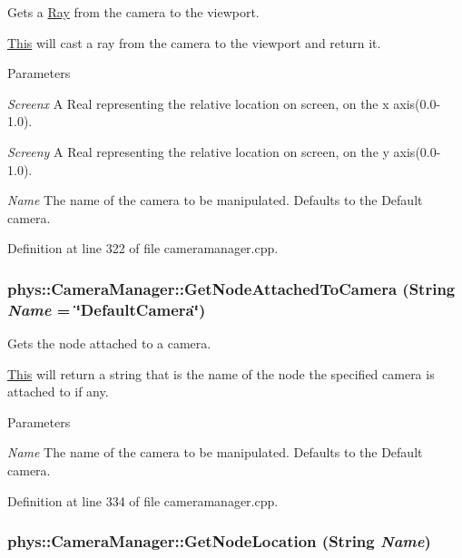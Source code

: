 Gets a \hyperlink{classphys_1_1Ray}{Ray} from the camera to the viewport. 

\hyperlink{structThis}{This} will cast a ray from the camera to the viewport and return it. 
\begin{DoxyParams}{Parameters}
\item[{\em Screenx}]A Real representing the relative location on screen, on the x axis(0.0-\/1.0). \item[{\em Screeny}]A Real representing the relative location on screen, on the y axis(0.0-\/1.0). \item[{\em Name}]The name of the camera to be manipulated. Defaults to the Default camera. \end{DoxyParams}


Definition at line 322 of file cameramanager.cpp.

\hypertarget{classphys_1_1CameraManager_a52a62fcfbeed45a2f527f626731ddcc1}{
\subsubsection[{GetNodeAttachedToCamera}]{ phys::CameraManager::GetNodeAttachedToCamera ({\bf String} {\em Name} = {\ttfamily \char`\"{}DefaultCamera\char`\"{}})}}
\label{d9/d91/classphys_1_1CameraManager_a52a62fcfbeed45a2f527f626731ddcc1}


Gets the node attached to a camera. 

\hyperlink{structThis}{This} will return a string that is the name of the node the specified camera is attached to if any. 
\begin{DoxyParams}{Parameters}
\item[{\em Name}]The name of the camera to be manipulated. Defaults to the Default camera. \end{DoxyParams}


Definition at line 334 of file cameramanager.cpp.

\hypertarget{classphys_1_1CameraManager_af5fcec9bebd90b8e98b0d2f4def97ea1}{
\subsubsection[{GetNodeLocation}]{ phys::CameraManager::GetNodeLocation ({\bf String} {\em Name})}}
\label{d9/d91/classphys_1_1CameraManager_af5fcec9bebd90b8e98b0d2f4def97ea1}


